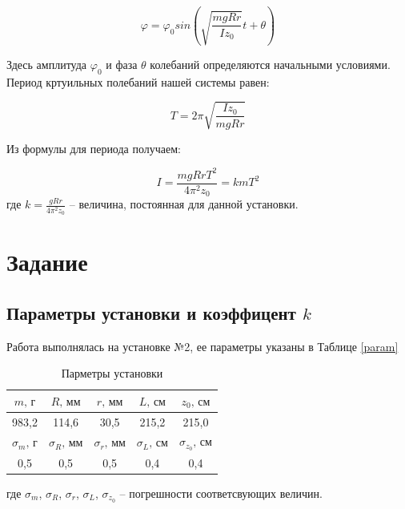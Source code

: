 	\begin{equation}
		\varphi = \varphi_0 sin \left(\sqrt{\frac{mgRr}{Iz_0}}t + \theta\right)
	\end{equation}
	
	Здесь амплитуда $\varphi_0$ и фаза $\theta$ колебаний определяются начальными условиями. Период кртуильных полебаний нашей системы равен:
	
	\begin{equation}
		T = 2\pi \sqrt{\frac{Iz_0}{mgRr}}
	\end{equation}
	
	Из формулы для периода получаем:
	
	\begin{equation}\label{momin}
		I = \frac{mgRrT^2}{4 \pi^2z_0} = kmT^2
	\end{equation}
	\noindent где $k = \frac{gRr}{4\pi^2z_0}$ -- величина, постоянная для данной установки.
	
	\section{Задание}
	
	\subsection{Параметры установки и коэффицент $k$}
	
	Работа выполнялась на установке №2, ее параметры указаны в Таблице \eqref{param}
	\begin{table}[H]
		\begin{center}
			\begin{tabular}{|c|c|c|c|c|}
				\hline
				$m \text{, г}$  & $R\text{, мм}$ & $r\text{, мм}$ & $L\text{, см}$ & $z_0\text{, см}$\\
				\hline
				983,2 & 114,6 & 30,5 & 215,2 & 215,0\\
				\hline
				\hline
				$\sigma_m \text{, г}$  & $\sigma_R\text{, мм}$ & $\sigma_r\text{, мм}$ & $\sigma_L\text{, см}$ & $\sigma_{z_0}\text{, см}$\\
				\hline
				0,5 & 0,5 & 0,5 & 0,4 & 0,4\\
				\hline 
			\end{tabular}
			\caption{Парметры установки}
			\label{param}
		\end{center}
	\end{table}
	
	\noindent где $\sigma_m$, $\sigma_R$, $\sigma_r$, $\sigma_L$, $\sigma_{z_0}$ -- погрешности соответсвующих величин.
	
